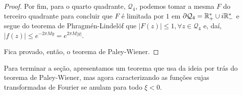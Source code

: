 \begin{proof}
            Por fim, para o quarto quadrante, $\mathcal{Q}_4$, podemos
            tomar a mesma $F$ do terceiro quadrante para concluir que 
            $F$ é limitada por $1$ em 
            $\partial\mathcal{Q}_4 = \mathbb{R}_+^* \cup i\mathbb{R}_-^*$ e segue
            do teorema de Phragmén-Lindelöf que $|F(z)| \leq 1,
            \forall z\in\mathcal{Q}_4$ e, daí, $|f(z)| \leq e^{-2\pi My}
            = e^{2\pi M|y|}$.
            
            Fica provado, então, o teorema de Paley-Wiener.
        \end{proof}
        
        Para terminar a seção, apresentamos um teorema que usa da
        ideia por trás do teorema de Paley-Wiener, mas agora caracterizando
        as funções cujas transformadas de Fourier se anulam para
        todo $\xi < 0$.
        
